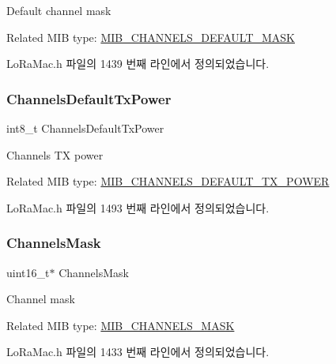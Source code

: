 Default channel mask

Related M\+IB type\+: \mbox{\hyperlink{group___l_o_r_a_m_a_c_gga32ea83d13a3f5bb4b3ec2ace2319ab61a59afc276ca425cd4055ff5cb5b5fa946}{M\+I\+B\+\_\+\+C\+H\+A\+N\+N\+E\+L\+S\+\_\+\+D\+E\+F\+A\+U\+L\+T\+\_\+\+M\+A\+SK}} 

Lo\+Ra\+Mac.\+h 파일의 1439 번째 라인에서 정의되었습니다.

\mbox{\label{unionu_mib_param_af926e909a910970adb9eccc849020c71}} 
\subsubsection{\texorpdfstring{Channels\+Default\+Tx\+Power}{ChannelsDefaultTxPower}}
{\footnotesize\ttfamily int8\+\_\+t Channels\+Default\+Tx\+Power}

Channels TX power

Related M\+IB type\+: \mbox{\hyperlink{group___l_o_r_a_m_a_c_gga32ea83d13a3f5bb4b3ec2ace2319ab61a9c5b2d3ad2caf87710b09e8a6e68cc6a}{M\+I\+B\+\_\+\+C\+H\+A\+N\+N\+E\+L\+S\+\_\+\+D\+E\+F\+A\+U\+L\+T\+\_\+\+T\+X\+\_\+\+P\+O\+W\+ER}} 

Lo\+Ra\+Mac.\+h 파일의 1493 번째 라인에서 정의되었습니다.

\mbox{\label{unionu_mib_param_aed7477cfc6166e3ee0499b898443426a}} 
\subsubsection{\texorpdfstring{Channels\+Mask}{ChannelsMask}}
{\footnotesize\ttfamily uint16\+\_\+t$\ast$ Channels\+Mask}

Channel mask

Related M\+IB type\+: \mbox{\hyperlink{group___l_o_r_a_m_a_c_gga32ea83d13a3f5bb4b3ec2ace2319ab61aafe40b1c0e252d607876423247feab62}{M\+I\+B\+\_\+\+C\+H\+A\+N\+N\+E\+L\+S\+\_\+\+M\+A\+SK}} 

Lo\+Ra\+Mac.\+h 파일의 1433 번째 라인에서 정의되었습니다.

\mbox{\label{unionu_mib_param_ad015aefb498e98276b4102f847b05d0e}} 
